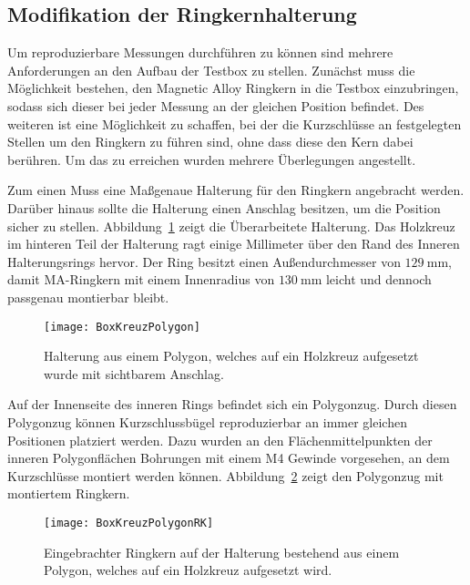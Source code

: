 \subsection{Modifikation der Ringkernhalterung}
Um reproduzierbare Messungen durchf\"uhren zu k\"onnen sind mehrere Anforderungen an den Aufbau der Testbox zu stellen. Zun\"achst muss die M\"oglichkeit bestehen, den Magnetic Alloy Ringkern in die Testbox einzubringen, sodass sich dieser bei jeder Messung an der gleichen Position befindet. Des weiteren ist eine M\"oglichkeit zu schaffen, bei der die Kurzschl\"usse an festgelegten  Stellen um den Ringkern zu f\"uhren sind, ohne dass diese den Kern dabei ber\"uhren. Um das zu erreichen wurden mehrere \"Uberlegungen angestellt.
\par
Zum einen Muss eine Ma\ss{}genaue Halterung f\"ur den Ringkern angebracht werden. Dar\"uber hinaus sollte die Halterung einen Anschlag besitzen, um die Position sicher zu stellen. Abbildung~\ref{fig:BoxKreuzPolygon} zeigt die \"Uberarbeitete Halterung. Das Holzkreuz im hinteren Teil der Halterung ragt einige Millimeter \"uber den Rand des Inneren Halterungsrings hervor. Der Ring besitzt einen Au\ss{}endurchmesser von $\SI{129}{\milli\meter}$, damit MA-Ringkern mit einem Innenradius von $\SI{130}{\milli\meter}$ leicht und dennoch passgenau montierbar bleibt.


\newpage


\begin{figure}[htb]
	\centering
	\texttt{[image: BoxKreuzPolygon]}
	\caption{Halterung aus einem Polygon, welches auf ein Holzkreuz aufgesetzt wurde mit sichtbarem Anschlag.}
	\label{fig:BoxKreuzPolygon}
\end{figure}
\par
Auf der Innenseite des inneren Rings befindet sich ein Polygonzug. Durch diesen Polygonzug k\"onnen Kurzschlussb\"ugel reproduzierbar an immer gleichen Positionen platziert werden. Dazu wurden an den Fl\"achenmittelpunkten der inneren Polygonfl\"achen Bohrungen mit einem M4 Gewinde vorgesehen, an dem Kurzschl\"usse montiert werden k\"onnen. Abbildung~\ref{fig:BoxKreuzPolygonRK} zeigt den Polygonzug mit montiertem Ringkern.






\begin{figure}[htb]
	\centering
	\texttt{[image: BoxKreuzPolygonRK]}
	\caption{Eingebrachter Ringkern auf der Halterung bestehend aus einem Polygon, welches auf ein Holzkreuz aufgesetzt wird.}
	\label{fig:BoxKreuzPolygonRK}
\end{figure}


